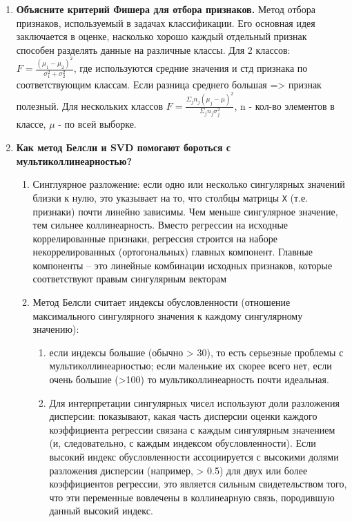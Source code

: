 \documentclass{article}
\begin{document}
\begin{enumerate}
\begin{enumerate}
    \end{enumerate}
    \item \textbf{Объясните критерий Фишера для отбора признаков.} Метод отбора признаков, используемый в задачах классификации. Его основная идея заключается в оценке, насколько хорошо каждый отдельный признак способен разделять данные на различные классы. Для 2 классов: $ F = \frac{(\mu_1 - \mu_2)^2}{\sigma_1^2 + \sigma_2^2}$, где используются средние значения и стд признака по соответствующим классам. Если разница среднего большая => признак полезный. Для нескольких классов $ F = \frac{  \Sigma_j n_j (\mu_j - \mu)^2}{\Sigma_j n_j \sigma_j^2} $, n - кол-во элементов в классе, $\mu$ - по всей выборке.
    \item \textbf{Как метод Белсли и SVD помогают бороться с мультиколлинеарностью?} 
    \begin{enumerate}
        \item Синглуярное разложение:  если одно или несколько сингулярных значений близки к нулю, это указывает на то, что столбцы матрицы \texttt{X} (т.е. признаки) почти линейно зависимы. Чем меньше сингулярное значение, тем сильнее коллинеарность. Вместо регрессии на исходные коррелированные признаки, регрессия строится на наборе некоррелированных (ортогональных) главных компонент. Главные компоненты -- это линейные комбинации исходных признаков, которые соответствуют правым сингулярным векторам
        \item Метод Белсли считает индексы обусловленности (отношение максимального сингулярного значения к каждому сингулярному значению): 
        \begin{enumerate}
            \item если индексы большие (обычно > 30), то есть серьезные проблемы с мультиколлинеарностью; если маленькие их скорее всего нет, если очень большие (>100) то мультиколлинеарность почти идеальная. 
            \item Для интерпретации сингулярных чисел используют доли разложения дисперсии: показывают, какая часть дисперсии оценки каждого коэффициента регрессии связана с каждым сингулярным значением (и, следовательно, с каждым индексом обусловленности). Если высокий индекс обусловленности ассоциируется с высокими долями разложения дисперсии (например, > 0.5) для двух или более коэффициентов регрессии, это является сильным свидетельством того, что эти переменные вовлечены в коллинеарную связь, породившую данный высокий индекс.
        \end{enumerate}
    \end{enumerate}
\end{enumerate}
\end{document}
